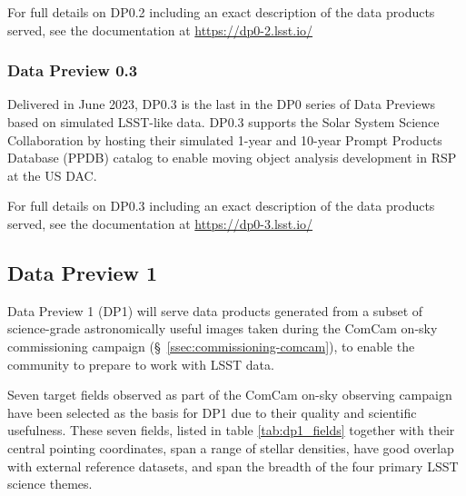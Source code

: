 For full details on DP0.2 including an exact description of the data products served, see the documentation at \url{https://dp0-2.lsst.io/}

\subsubsection{Data Preview 0.3}
\label{sec:dp03}

Delivered in June  2023, DP0.3 is the last in the DP0 series of Data Previews based on simulated LSST-like data. 
DP0.3 supports the Solar System Science Collaboration by hosting their simulated 1-year and 10-year Prompt Products Database (PPDB) catalog to enable moving object analysis development  in  RSP at the US DAC. 

For full details on DP0.3 including an exact description of the data products served, see the documentation at \url{https://dp0-3.lsst.io/}

\subsection{Data Preview 1}
\label{sec:dp1}

Data Preview 1 (DP1) will serve data products generated from a subset of science-grade astronomically useful images  taken  during  the ComCam on-sky commissioning campaign (\S~\ref{ssec:commissioning-comcam}), to enable the community to prepare to work with LSST data. 

Seven target fields observed as part of the ComCam on-sky observing campaign  have been selected as the basis for DP1 due to their quality and scientific usefulness.  
These seven fields, listed in table \ref{tab:dp1_fields} together with their central pointing coordinates, span a range of stellar densities, have good overlap with external reference datasets, and span the breadth of the four primary LSST science themes.


